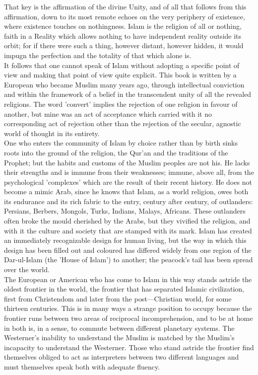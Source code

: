 \documentclass[11pt, b5paper, twoside]{book}
\begin{document}
That key is the affirmation of the divine Unity, and of all that follows from this affirmation, down to its most remote echoes on the very periphery of existence, where existence touches on nothingness. Islam is the religion of all or nothing, faith in a Reality which allows nothing to have independent reality outside its orbit; for if there were such a thing, however distant, however hidden, it would impugn the perfection and the totality of that which alone is.\\

It follows that one cannot speak of Islam without adopting a specific point of view and making that point of view quite explicit. This book is written by a European who became Muslim many years ago, through intellectual conviction and within the framework of a belief in the transcendent unity of all the revealed religions. The word 'convert' implies the rejection of one religion in favour of another, but mine was an act of acceptance which carried with it no corresponding act of rejection other than the rejection of the secular, agnostic world of thought in its entirety. \\

One who enters the community of Islam by choice rather than by birth sinks roots into the ground of the religion, the Qur'an and the traditions of the Prophet; but the habits and customs of the Muslim peoples are not his. He lacks their strengths and is immune from their weaknesses; immune, above all, from the psychological 'complexes' which are the result of their recent history. He does not become a mimic Arab, since he knows that Islam, as a world religion, owes both its endurance and its rich fabric to the entry, century after century, of outlanders: Persians, Berbers, Mongols, Turks, Indians, Malays, Africans. These outlanders often broke the mould cherished by the Arabs, but they vivified the religion, and with it the culture and society that are stamped with its mark. Islam has created an immediately recognizable design for human living, but the way in which this design has been filled out and coloured has differed widely from one region of the Dar-ul-Islam (the 'House of Islam') to another; the peacock's tail has been spread over the world. \\

The European or American who has come to Islam in this way stands astride the oldest frontier in the world, the frontier that has separated Islamic civilization, first from Christendom and later from the post---Christian world, for some thirteen centuries. This is in many ways a strange position to occupy because the frontier runs between two areas of reciprocal incomprehension, and to be at home in both is, in a sense, to commute between different planetary systems. The Westerner's inability to understand the Muslim is matched by the Muslim's incapacity to understand the Westerner. Those who stand astride the frontier find themselves obliged to act as interpreters between two different languages and must themselves speak both with adequate fluency. \\
\end{document}
